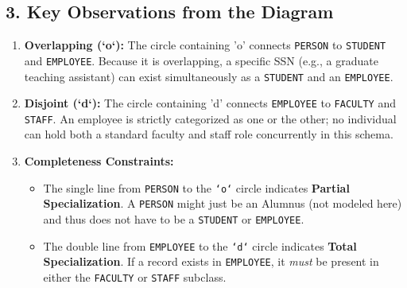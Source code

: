 \documentclass[12pt,a3paper]{article}
\begin{document}
\begin{enumerate}
\begin{tcolorbox}[enhanced,breakable,ansbox,colback=cA!4,colframe=cA,boxrule=0.8pt,arc=5pt,title={\textbf{Answer}},fonttitle=\bfseries\color{white},colbacktitle=cA]
\begin{center}
\end{center}
\vspace{1.5em}

\subsection*{3. Key Observations from the Diagram}

\begin{enumerate}
    \item \textbf{Overlapping (`o`):} The circle containing 'o' connects \texttt{PERSON} to \texttt{STUDENT} and \texttt{EMPLOYEE}. Because it is overlapping, a specific SSN (e.g., a graduate teaching assistant) can exist simultaneously as a \texttt{STUDENT} and an \texttt{EMPLOYEE}.
    \item \textbf{Disjoint (`d`):} The circle containing 'd' connects \texttt{EMPLOYEE} to \texttt{FACULTY} and \texttt{STAFF}. An employee is strictly categorized as one or the other; no individual can hold both a standard faculty and staff role concurrently in this schema.
    \item \textbf{Completeness Constraints:}
    \begin{itemize}
        \item The single line from \texttt{PERSON} to the \texttt{`o`} circle indicates \textbf{Partial Specialization}. A \texttt{PERSON} might just be an Alumnus (not modeled here) and thus does not have to be a \texttt{STUDENT} or \texttt{EMPLOYEE}.
        \item The double line from \texttt{EMPLOYEE} to the \texttt{`d`} circle indicates \textbf{Total Specialization}. If a record exists in \texttt{EMPLOYEE}, it \textit{must} be present in either the \texttt{FACULTY} or \texttt{STAFF} subclass.
    \end{itemize}
\end{enumerate}

\end{tcolorbox}


\end{enumerate}
\end{document}
